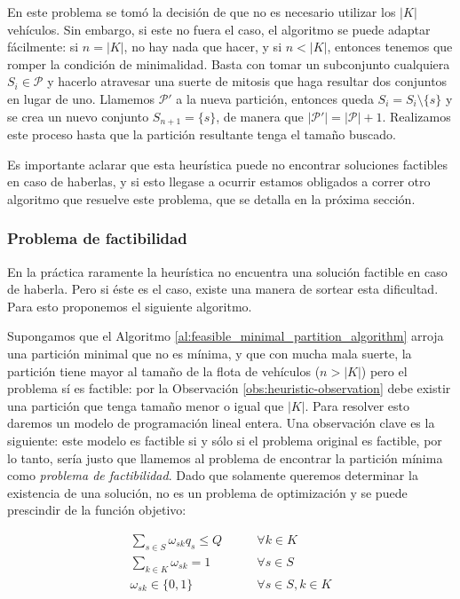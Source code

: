 En este problema se tomó la decisión de que no es necesario utilizar los $|K|$ vehículos. Sin embargo, si este no fuera el caso, el algoritmo se puede adaptar fácilmente: si $n = |K|$, no hay nada que hacer, y si $n < |K|$, entonces tenemos que romper la condición de minimalidad. Basta con tomar un subconjunto cualquiera $S_i \in \mathscr{P}$ y hacerlo atravesar una suerte de mitosis que haga resultar dos conjuntos en lugar de uno. Llamemos $\mathscr{P'}$ a la nueva partición, entonces queda $S_i = S_i \setminus \{s\}$ y se crea un nuevo conjunto $S_{n+1} = \{s\}$, de manera que $|\mathscr{P'}| = |\mathscr{P}| + 1$. Realizamos este proceso hasta que la partición resultante tenga el tamaño buscado.

Es importante aclarar que esta heurística puede no encontrar soluciones factibles en caso de haberlas, y si esto llegase a ocurrir estamos obligados a correr otro algoritmo que resuelve este problema, que se detalla en la próxima sección.


\subsubsection{Problema de factibilidad}
\label{feasibility-problem}

En la práctica raramente la heurística no encuentra una solución factible en caso de haberla. Pero si éste es el caso, existe una manera de sortear esta dificultad. Para esto proponemos el siguiente algoritmo.

Supongamos que el Algoritmo \ref{al:feasible_minimal_partition_algorithm} arroja una partición minimal que no es mínima, y que con mucha mala suerte, la partición tiene mayor al tamaño de la flota de vehículos ($n > |K|$) pero el problema sí es factible: por la Observación \ref{obs:heuristic-observation} debe existir una partición que tenga tamaño menor o igual que $|K|$. Para resolver esto daremos un modelo de programación lineal entera. Una observación clave es la siguiente: este modelo es factible si y sólo si el problema original es factible, por lo tanto, sería justo que llamemos al problema de encontrar la partición mínima como \emph{problema de factibilidad}. Dado que solamente queremos determinar la existencia de una solución, no es un problema de optimización y se puede prescindir de la función objetivo:

\begin{align}
    \sum_{s \in S}{\omega_{sk} q_s} \leq Q \qquad & \forall {k \in K} \label{eq:feasibility1} \\
    \sum_{k \in K}{\omega_{sk}} = 1 \qquad & \forall {s \in S} \label{eq:feasibility2} \\
    \omega_{sk} \in \{0, 1\} \qquad & \forall {s \in S, k \in K} \label{eq:feasibility3}
\end{align}

